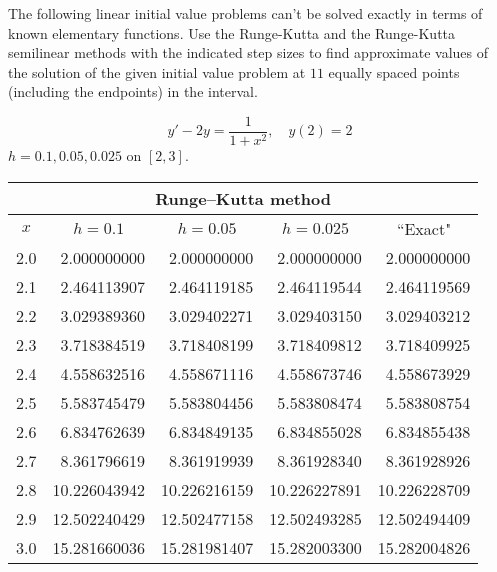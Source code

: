 \documentclass{ximera}
\begin{document}
\begin{problem}\label{exer:3.3.14} The following linear initial value problems can't be solved exactly in terms of known elementary functions. Use the Runge-Kutta and the Runge-Kutta semilinear methods with the
indicated step sizes to find approximate values of the solution of the given initial value problem at $11$ equally spaced points (including the endpoints) in the interval.

$$y'-2y=\frac{1}{1+x^2},\quad y(2)=2$$ 
$h=0.1,0.05,0.025$ on $[2,3]$.

\begin{solution}
    {\small
\begin{tabular}{|c|r|r|r|r|}
\hline
\multicolumn{5}{|c|}{Runge--Kutta method}\\\hline
\multicolumn{1}{|c|}{$x$}&
\multicolumn{1}{|c|}{$h=0.1$}&
\multicolumn{1}{|c|}{$h=0.05$}&
\multicolumn{1}{|c|}{$h=0.025$}&
\multicolumn{1}{|c|}{``Exact"}\\ \hline
2.0 &  2.000000000 &  2.000000000 &  2.000000000 &  2.000000000 \\
2.1 &  2.464113907 &  2.464119185 &  2.464119544 &  2.464119569 \\
2.2 &  3.029389360 &  3.029402271 &  3.029403150 &  3.029403212 \\
2.3 &  3.718384519 &  3.718408199 &  3.718409812 &  3.718409925 \\
2.4 &  4.558632516 &  4.558671116 &  4.558673746 &  4.558673929 \\
2.5 &  5.583745479 &  5.583804456 &  5.583808474 &  5.583808754 \\
2.6 &  6.834762639 &  6.834849135 &  6.834855028 &  6.834855438 \\
2.7 &  8.361796619 &  8.361919939 &  8.361928340 &  8.361928926 \\
2.8 & 10.226043942 & 10.226216159 & 10.226227891 & 10.226228709 \\
2.9 & 12.502240429 & 12.502477158 & 12.502493285 & 12.502494409 \\
3.0 & 15.281660036 & 15.281981407 & 15.282003300 & 15.282004826 \\
 \hline
\end{tabular}}


\end{solution}
\end{problem}
\end{document}

